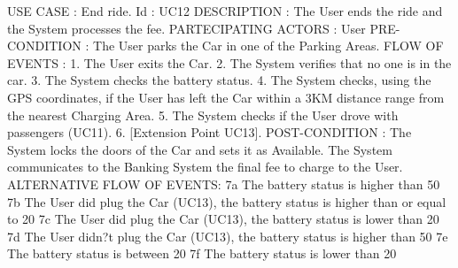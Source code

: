 USE CASE : End ride.
Id : UC12
DESCRIPTION : The User ends the ride and the System processes the fee.
PARTECIPATING ACTORS : User 
PRE-CONDITION : The User parks the Car in one of the Parking Areas.
FLOW OF EVENTS : 
1. The User exits the Car.
2. The System verifies that no one is in the car.
3. The System checks the battery status. 
4. The System checks, using the GPS coordinates, if the User has left the Car within a 3KM distance range from the nearest Charging Area.
5. The System checks if the User drove with passengers (UC11).
6. [Extension Point UC13].
POST-CONDITION :  
The System locks the doors of the Car and sets it as Available.
The System communicates to the Banking System the final fee to charge to the User.
ALTERNATIVE FLOW OF EVENTS:
7a 	The battery status is higher than 50%
7b The User did plug the Car (UC13), the battery status is higher than or equal to 20%
7c The User did plug the Car (UC13), the battery status is lower than 20%
7d The User didn?t plug the Car (UC13), the battery status is higher than 50%
7e 	The battery status is between 20%
7f The battery status is lower than 20%
